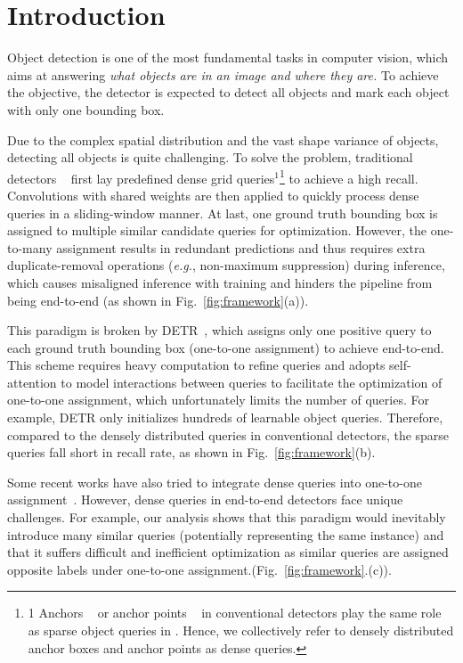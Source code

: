 \documentclass[10pt,twocolumn,letterpaper]{article}
\begin{document}
\section{Introduction} \label{sec:intro} Object detection is one of the most fundamental tasks in computer vision, which aims at answering \emph{what objects are in an image and where they are.} To achieve the objective, the detector is expected to detect all objects and mark each object with only one bounding box.

Due to the complex spatial distribution and the vast shape variance of objects, detecting all objects is quite challenging. To solve the problem, traditional detectors ~\cite{ren2015faster, lin2017focal, tian2019fcos}  first lay predefined dense grid queries$^1$\footnote{1 Anchors ~\cite{ren2015faster, lin2017focal} or anchor points ~\cite{tian2019fcos}  in conventional detectors play the same role as sparse object queries in \cite{carion2020end}. Hence, we collectively refer to densely distributed anchor boxes and anchor points as dense queries.} to achieve a high recall. Convolutions with shared weights are then applied to quickly process dense queries in a sliding-window manner. At last, one ground truth bounding box is assigned to multiple similar candidate queries for optimization. However, the one-to-many assignment results in redundant predictions and thus requires extra duplicate-removal operations  (\emph{e.g.}, non-maximum suppression) during inference, which causes misaligned inference with training and hinders the pipeline from being end-to-end (as shown in Fig.~\ref{fig:framework}(a)). 


This paradigm is broken by DETR~\cite{carion2020end}, which assigns only one positive query to each ground truth bounding box (one-to-one assignment) to achieve end-to-end. This scheme requires heavy computation to refine queries and adopts self-attention to model interactions between queries to facilitate the optimization of one-to-one assignment, which unfortunately limits the number of queries. For example, DETR only initializes hundreds of learnable object queries. Therefore, compared to the densely distributed queries in conventional detectors, the sparse queries fall short in recall rate, as shown in Fig.~\ref{fig:framework}(b).

Some recent works have also tried to integrate dense queries into one-to-one assignment~\cite{wang2021end, pmlr-v139-sun21b, yao2021efficient}. However, dense queries in end-to-end detectors face unique challenges. For example, our analysis shows that this paradigm would inevitably introduce many similar queries (potentially representing the same instance) and that it suffers difficult and inefficient optimization as similar queries are assigned opposite labels under one-to-one assignment.(Fig.~\ref{fig:framework}.(c)). 
\end{document}
